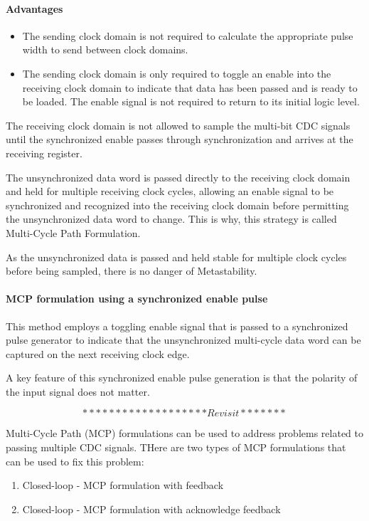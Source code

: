 \paragraph{Advantages}
\begin{itemize}
\item The sending clock domain is not required to calculate the appropriate pulse width to send between clock domains.
\item The sending clock domain is only required to toggle an enable into the receiving clock domain to indicate that data has been passed and is ready to be loaded. The enable signal is not required to return to its initial logic level.
\end{itemize}
The receiving clock domain is not
allowed to sample the multi-bit CDC signals until the synchronized enable passes through synchronization and arrives at the receiving register.

The unsynchronized data word is passed directly to the receiving clock domain and held for multiple receiving clock cycles, allowing an enable signal to be synchronized and recognized into the receiving clock domain before permitting the unsynchronized data word to change. This is why, this strategy is called Multi-Cycle Path Formulation.

\par As the unsynchronized data is passed and held stable for multiple clock cycles before being sampled, there is no danger of Metastability.


\paragraph{MCP formulation using a synchronized enable pulse}
This method employs a toggling enable signal that is passed to a synchronized pulse generator to indicate that the unsynchronized multi-cycle data word can be captured on the next receiving clock edge.

A key feature of this synchronized enable pulse generation is that the polarity of the input signal does not matter.

\[*******************Revisit*******\]


Multi-Cycle Path (MCP) formulations can be used to address problems related to passing multiple CDC signals. THere are two types of MCP formulations that can be used to fix this problem:
\begin{enumerate}
	\item Closed-loop - MCP formulation with feedback
	\item Closed-loop - MCP formulation with acknowledge feedback
\end{enumerate}

